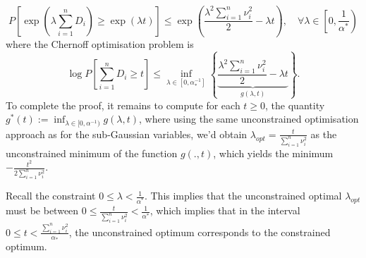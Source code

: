 \documentclass[10pt,handout,english]{beamer}
\newcommand{\1}{\mathbbm{1}}
\begin{document}
\begin{frame}[allowframebreaks]
\[
P\left[\exp\left(\lambda\sum\limits_{i=1}^{n} D_i\right)\geq \exp\left(\lambda t\right)\right]\leq\exp\left(\frac{\lambda^2\sum_{i=1}^n\nu_i^2}{2}-\lambda t\right),\quad\forall \lambda\in\left[0,\frac{1}{\alpha^*}\right)
\]
where the Chernoff optimisation problem is
\[
\log P\left[\sum\limits_{i=1}^n D_i\geq t\right]\leq \inf_{\lambda\in[0,\alpha_{*}^{-1}]}\left\{\underbrace{\frac{\lambda^2\sum_{i=1}^n\nu_i^2}{2}-\lambda t}_{g(\lambda,t)}\right\}.
\]
To complete the proof, it remains to compute for each $t\geq0$, the quantity $g^*(t):=\inf_{\lambda\in[0,\alpha^{-1})}g(\lambda,t)$, where using the same unconstrained optimisation approach as for the sub-Gaussian variables, we'd obtain $\lambda_{opt}=\frac{t}{\sum_{i=1}^n\nu_i^2}$ as the unconstrained minimum of the function $g(.,t)$, which yields the minimum $-\frac{t^2}{2\sum_{i=1}^{n}\nu_i^2}$.

Recall the constraint $0\leq\lambda<\frac{1}{\alpha^*}$. This implies that the unconstrained optimal $\lambda_{opt}$ must be between $0\leq\frac{t}{\sum_{i=1}^n\nu_i^2}<\frac{1}{\alpha^*}$, which implies that in the interval $0\leq t<\frac{\sum_{i=1}^n \nu_i^2}{\alpha_*}$, the unconstrained optimum corresponds to the constrained optimum. 


\end{frame}
\end{document}
